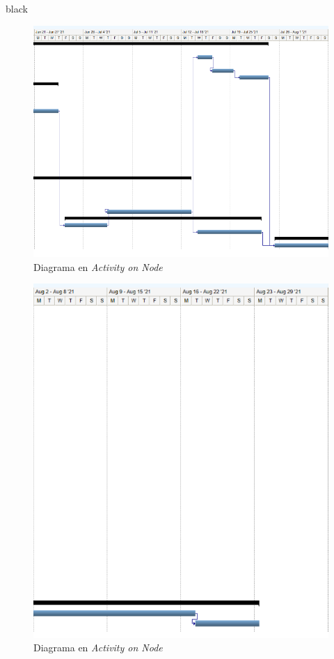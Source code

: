\documentclass[11pt]{charter}
\begin{document}
\begin{consigna}{black}
\begin{figure}[htpb]
\centering 
\includegraphics[width=.9\textwidth]{./Figuras/c4.PNG}
\caption{Diagrama en \textit{Activity on Node}}
\label{fig:g4}
\end{figure}

\begin{figure}[htpb]
\centering 
\includegraphics[width=.9\textwidth]{./Figuras/c5.PNG}
\caption{Diagrama en \textit{Activity on Node}}
\label{fig:g5}
\end{figure}

\end{consigna}
\end{document}
